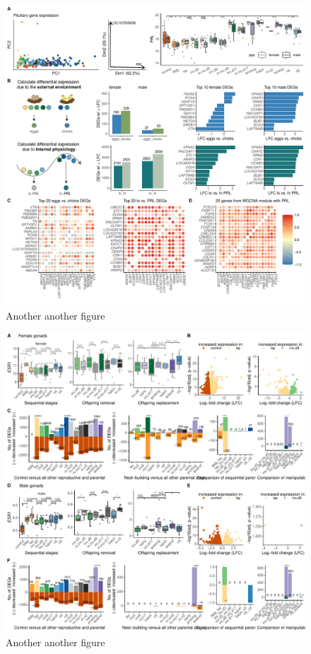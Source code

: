 \begin{figure}[ht]
  \centering
  \includegraphics[width=1.0\textwidth]{../../figures/fig3-1}
  \caption{Another another figure}
  \label{figure:fig3}
\end{figure}

\newpage

\begin{figure}[ht]
  \centering
  \includegraphics[width=1.0\textwidth]{../../figures/fig4-1}
  \caption{Another another figure}
  \label{figure:fig4}
\end{figure}

